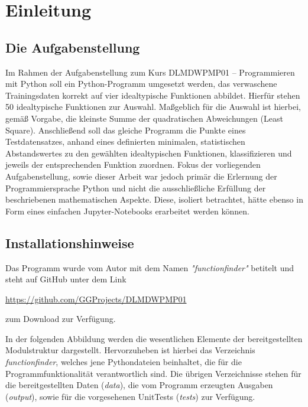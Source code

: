 \chapter{Einleitung}

\section{Die Aufgabenstellung}

Im Rahmen der Aufgabenstellung zum Kurs DLMDWPMP01 – Programmieren mit Python soll ein Python-Programm umgesetzt werden, das verwaschene Trainingsdaten korrekt auf vier idealtypische Funktionen abbildet. Hierfür stehen 50 idealtypische Funktionen zur Auswahl. Maßgeblich für die Auswahl ist hierbei, gemäß Vorgabe, die kleinste Summe der quadratischen Abweichungen (Least Square).
Anschließend soll das gleiche Programm die Punkte eines Testdatensatzes, anhand eines definierten minimalen, statistischen Abstandswertes zu den gewählten idealtypischen Funktionen, klassifizieren und jeweils der entsprechenden Funktion zuordnen.
Fokus der vorliegenden Aufgabenstellung, sowie dieser Arbeit war jedoch primär die Erlernung der Programmiersprache Python und nicht die ausschließliche Erfüllung der beschriebenen mathematischen Aspekte. Diese, isoliert betrachtet, hätte ebenso in Form eines einfachen Jupyter-Notebooks erarbeitet werden können.


\section{Installationshinweise}

Das Programm wurde vom Autor mit dem Namen \emph{"functionfinder"} betitelt und steht auf GitHub unter dem Link \begin{center}\url{https://github.com/GGProjects/DLMDWPMP01}\end{center} zum Download zur Verfügung.

In der folgenden Abbildung werden die wesentlichen Elemente der bereitgestellten Modulstruktur dargestellt. Hervorzuheben ist hierbei das Verzeichnis \emph{functionfinder}, welches jene Pythondateien beinhaltet, die für die Programmfunktionalität verantwortlich sind.
Die übrigen Verzeichnisse stehen für die bereitgestellten Daten (\emph{data}), die vom Programm erzeugten Ausgaben (\emph{output}), sowie für die vorgesehenen UnitTests (\emph{tests}) zur Verfügung.

	

